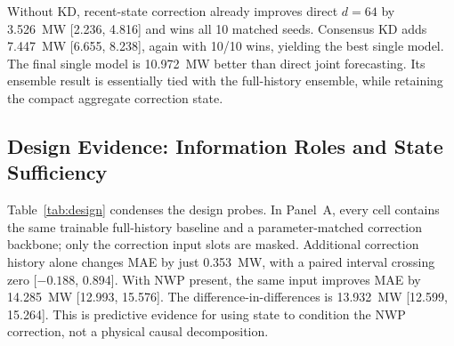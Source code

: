 \documentclass[conference]{IEEEtran}
\begin{document}
\begin{table}[t]
\caption{2023 validation cluster MAE (MW), 10 seeds. ``Ens.'' averages the 10 predictions and is diagnostic; the proposed deployment is one KD student.}
\label{tab:main}
\centering
\small
\setlength{\tabcolsep}{3.5pt}
\end{table}

Without KD, recent-state correction already improves direct $d=64$ by 3.526~MW [2.236, 4.816] and wins all 10 matched seeds. Consensus KD adds 7.447~MW [6.655, 8.238], again with 10/10 wins, yielding the best single model. The final single model is 10.972~MW better than direct joint forecasting. Its ensemble result is essentially tied with the full-history ensemble, while retaining the compact aggregate correction state.

\subsection{Design Evidence: Information Roles and State Sufficiency}

Table~\ref{tab:design} condenses the design probes. In Panel~A, every cell contains the same trainable full-history baseline and a parameter-matched correction backbone; only the correction input slots are masked. Additional correction history alone changes MAE by just 0.353~MW, with a paired interval crossing zero [$-0.188$, 0.894]. With NWP present, the same input improves MAE by 14.285~MW [12.993, 15.576]. The difference-in-differences is 13.932~MW [12.599, 15.264]. This is predictive evidence for using state to condition the NWP correction, not a physical causal decomposition.
\end{document}
